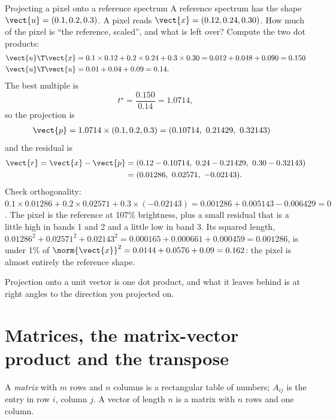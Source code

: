 \begin{worked}[label={we:linalg:proj3b}]{Projecting a pixel onto a reference spectrum}
A reference spectrum has the shape $\vect{u} = (0.1, 0.2, 0.3)$. A pixel reads
$\vect{x} = (0.12, 0.24, 0.30)$. How much of the pixel is ``the reference, scaled'', and what is
left over? Compute the two dot products:
\begin{align*}
\vect{u}\T\vect{x} &= 0.1\times0.12 + 0.2\times0.24 + 0.3\times0.30
  = 0.012 + 0.048 + 0.090 = 0.150\\
\vect{u}\T\vect{u} &= 0.01 + 0.04 + 0.09 = 0.14 .
\end{align*}
The best multiple is
\[
t^\star = \frac{0.150}{0.14} = 1.0714 ,
\]
so the projection is
\begin{align*}
\vect{p} = 1.0714 \times (0.1, 0.2, 0.3)
&= (0.10714,\ 0.21429,\ 0.32143)
\end{align*}
and the residual is
\begin{align*}
\vect{r} = \vect{x} - \vect{p}
&= (0.12 - 0.10714,\ 0.24 - 0.21429,\ 0.30 - 0.32143)\\
&= (0.01286,\ 0.02571,\ -0.02143).
\end{align*}
Check orthogonality:
$0.1\times0.01286 + 0.2\times0.02571 + 0.3\times(-0.02143) = 0.001286 + 0.005143 - 0.006429 = 0$.
The pixel is the reference at 107\% brightness, plus a small residual that is a little high in
bands 1 and 2 and a little low in band 3. Its squared length,
$0.01286^2 + 0.02571^2 + 0.02143^2 = 0.000165 + 0.000661 + 0.000459 = 0.001286$, is under 1\% of
$\norm{\vect{x}}^2 = 0.0144 + 0.0576 + 0.09 = 0.162$: the pixel is almost entirely the
reference shape.
\end{worked}

\begin{keypoint}
Projection onto a unit vector is one dot product, and what it leaves behind is at right angles
to the direction you projected on.
\end{keypoint}

\section{Matrices, the matrix-vector product and the transpose}\label{sec:linalg:matrices}

\begin{definition}[Matrix]
A \emph{matrix} with $m$ rows and $n$ columns is a rectangular table of numbers; $A_{ij}$ is the
entry in row $i$, column $j$. A vector of length $n$ is a matrix with $n$ rows and one column.
\end{definition}

